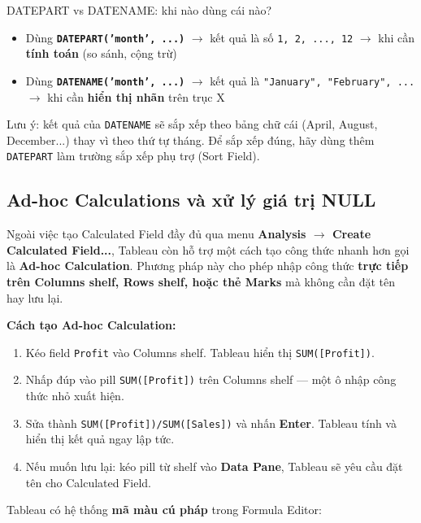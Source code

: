\documentclass[12pt]{article}
\begin{document}
\begin{tipbox}{DATEPART vs DATENAME: khi nào dùng cái nào?}
\begin{itemize}[nosep]
    \item Dùng \textbf{\texttt{DATEPART('month', ...)}} $\rightarrow$ kết quả là số \texttt{1, 2, ..., 12} $\rightarrow$ khi cần \textbf{tính toán} (so sánh, cộng trừ)
    \item Dùng \textbf{\texttt{DATENAME('month', ...)}} $\rightarrow$ kết quả là \texttt{"January", "February", ...} $\rightarrow$ khi cần \textbf{hiển thị nhãn} trên trục X
\end{itemize}
\noindent Lưu ý: kết quả của \texttt{DATENAME} sẽ sắp xếp theo bảng chữ cái (April, August, December...) thay vì theo thứ tự tháng. Để sắp xếp đúng, hãy dùng thêm \texttt{DATEPART} làm trường sắp xếp phụ trợ (Sort Field).
\end{tipbox}

\subsection{Ad-hoc Calculations và xử lý giá trị NULL}

\noindent Ngoài việc tạo Calculated Field đầy đủ qua menu \textbf{Analysis $\rightarrow$ Create Calculated Field...}, Tableau còn hỗ trợ một cách tạo công thức nhanh hơn gọi là \textbf{Ad-hoc Calculation}. Phương pháp này cho phép nhập công thức \textbf{trực tiếp trên Columns shelf, Rows shelf, hoặc thẻ Marks} mà không cần đặt tên hay lưu lại.

\noindent \textbf{Cách tạo Ad-hoc Calculation:}
\begin{enumerate}[nosep]
    \item Kéo field \texttt{Profit} vào Columns shelf. Tableau hiển thị \texttt{SUM([Profit])}.
    \item Nhấp đúp vào pill \texttt{SUM([Profit])} trên Columns shelf --- một ô nhập công thức nhỏ xuất hiện.
    \item Sửa thành \texttt{SUM([Profit])/SUM([Sales])} và nhấn \textbf{Enter}. Tableau tính và hiển thị kết quả ngay lập tức.
    \item Nếu muốn lưu lại: kéo pill từ shelf vào \textbf{Data Pane}, Tableau sẽ yêu cầu đặt tên cho Calculated Field.
\end{enumerate}

\noindent Tableau có hệ thống \textbf{mã màu cú pháp} trong Formula Editor:
\end{document}
